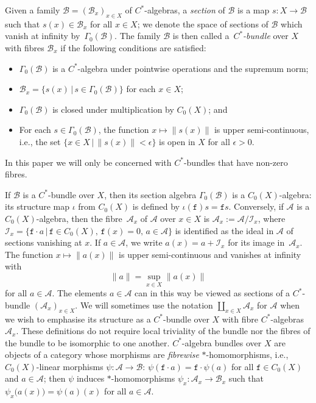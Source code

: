 \documentclass[pdftex]{sigma}
\numberwithin{equation}{section}
\newcommand{\CI}{\mathcal{I}}
\def\alg{{\mathcal A}}
\def\balg{{\mathcal B}}
\begin{document}
Given a family $\balg=(\balg_x)_{x\in X}$ of $C^*$-algebras, a
\emph{section} of $\balg$ is
a map $s\colon X\to\balg$ such that $s(x)\in\balg_x$ for all $x\in X$; we
denote the space of sections of $\balg$ which vanish at infinity by~$\Gamma_0(\balg)$. The family $\balg$ is then called a~\emph{$C^*$-bundle} over $X$ with fibres $\balg_x$ if the following
conditions are satisfied:
\begin{itemize}\itemsep=0pt
\item
$\Gamma_0(\balg)$ is a $C^*$-algebra under pointwise operations and the
 supremum norm;
\item $\balg_x=\{s(x)\, |\, s\in\Gamma_0(\balg)\}$ for each
 $x\in X$;
\item $\Gamma_0(\balg)$ is closed under multiplication by
 $C_0(X)$; and
\item For each $s\in\Gamma_0(\balg)$, the function $x\mapsto \|s(x)\|$
is upper semi-continuous, i.e., the set
$\{x\in X \,|\, \|s(x)\|< \epsilon\}$ is open in $X$ for all $\epsilon>0$.
\end{itemize}
In this
paper we will only be concerned with $C^*$-bundles that have non-zero fibres.

If $\balg$ is a $C^*$-bundle over $X$, then its section algebra
$\Gamma_0(\balg)$ is a $C_0(X)$-algebra: its structure map $\iota$ from
$C_0(X)$ is defined by $\iota(\mathtt{f})s=\mathtt{f} s$. Conversely, if $\alg$ is a
$C_0(X)$-algebra, then the fibre~$\alg_x$ of $\alg$ over $x\in X$ is $\alg_x:=\alg/\CI_x$, where
$\CI_x=\{\mathtt{f}\cdot a\, |\, \mathtt{f}\in C_0(X) , \,
\mathtt{f}(x)=0 , \, a\in\alg\}$ is identified as the ideal in
$\alg$ of sections vanishing at $x$. If
$a\in\alg$, we write $a(x)=a+\CI_x$ for its image in~$\alg_x$. The
function $x\mapsto\|a(x)\|$ is upper semi-continuous
and vanishes at infinity with
\[
\|a\| = \sup_{x\in X} \big\|a(x)\big\|
\]
for all $a\in\alg$. The
elements $a\in \alg$ can in this way be viewed as sections of a
$C^*$-bundle $(\alg_x)_{x\in X}$. We will sometimes use the
notation $\coprod_{x\in X} \alg_x$ for $\alg$ when we wish to emphasise
its structure as a $C^*$-bundle over $X$ with fibre $C^*$-algebras
$\alg_x$. These definitions do not require
local triviality of the bundle nor the fibres of the bundle to be
isomorphic to one another. $C^*$-algebra bundles over $X$ are objects of a
category whose morphisms are \emph{fibrewise} $*$-homomorphisms,
i.e., $C_0(X)$-linear morphisms $\psi\colon \alg\to\balg$: $\psi(\mathtt{f}\cdot
a)=\mathtt{f}\cdot\psi(a)$ for all $\mathtt{f}\in C_0(X)$ and $a\in\alg$; then $\psi$
induces $*$-homomorphisms $\psi_x\colon \alg_x\to\balg_x$ such that
$\psi_x\big(a(x)\big)=\psi(a)(x)$ for all $a\in\alg$.
\end{document}
